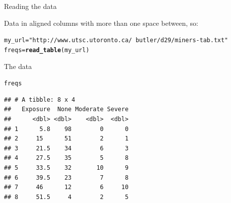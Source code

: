 \documentclass[unknownkeysallowed]{beamer}\usepackage[]{graphicx}\usepackage[]{color}
\makeatletter
\newcommand{\hlstr}[1]{\textcolor[rgb]{0.192,0.494,0.8}{#1}}%
\newcommand{\hlstd}[1]{\textcolor[rgb]{0.345,0.345,0.345}{#1}}%
\newcommand{\hlkwb}[1]{\textcolor[rgb]{0.69,0.353,0.396}{#1}}%
\newcommand{\hlkwd}[1]{\textcolor[rgb]{0.737,0.353,0.396}{\textbf{#1}}}%
\newenvironment{kframe}{%
 \def\at@end@of@kframe{}%
 \ifinner\ifhmode%
  \def\at@end@of@kframe{\end{minipage}}%
  \begin{minipage}{\columnwidth}%
 \fi\fi%
 \def\FrameCommand##1{\hskip\@totalleftmargin \hskip-\fboxsep
 \colorbox{shadecolor}{##1}\hskip-\fboxsep
     \hskip-\linewidth \hskip-\@totalleftmargin \hskip\columnwidth}%
 \MakeFramed {\advance\hsize-\width
   \@totalleftmargin\z@ \linewidth\hsize
   \@setminipage}}%
 {\par\unskip\endMakeFramed%
 \at@end@of@kframe}
\newenvironment{knitrout}{}{} %
\makeatother
\begin{document}
\begin{frame}[fragile]{Reading the data}

Data in aligned columns with more than one space between, so: 
  
\begin{knitrout}
\color{fgcolor}\begin{kframe}
\begin{alltt}
\hlstd{my_url}\hlkwb{=}\hlstr{"http://www.utsc.utoronto.ca/~butler/d29/miners-tab.txt"}
\hlstd{freqs}\hlkwb{=}\hlkwd{read_table}\hlstd{(my_url)}
\end{alltt}


{\ttfamily\noindent\itshape\color{messagecolor}{\#\# Parsed with column specification:\\\#\# cols(\\\#\#\ \  Exposure = col\_double(),\\\#\#\ \  None = col\_double(),\\\#\#\ \  Moderate = col\_double(),\\\#\#\ \  Severe = col\_double()\\\#\# )}}\end{kframe}
\end{knitrout}

  
\end{frame}

\begin{frame}[fragile]{The data}
  
\begin{knitrout}
\color{fgcolor}\begin{kframe}
\begin{alltt}
\hlstd{freqs}
\end{alltt}
\begin{verbatim}
## # A tibble: 8 x 4
##   Exposure  None Moderate Severe
##      <dbl> <dbl>    <dbl>  <dbl>
## 1      5.8    98        0      0
## 2     15      51        2      1
## 3     21.5    34        6      3
## 4     27.5    35        5      8
## 5     33.5    32       10      9
## 6     39.5    23        7      8
## 7     46      12        6     10
## 8     51.5     4        2      5
\end{verbatim}
\end{kframe}
\end{knitrout}
  
\end{frame}
\end{document}
